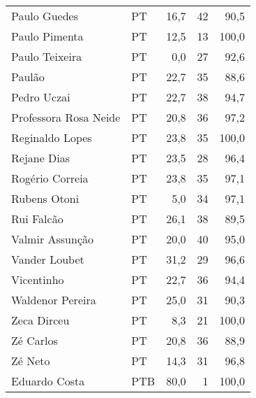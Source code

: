 \begin{longtable}{llrrr}
                        Paulo Guedes &             PT &      16,7 &           42 &       90,5 \\
                       Paulo Pimenta &             PT &      12,5 &           13 &      100,0 \\
                      Paulo Teixeira &             PT &       0,0 &           27 &       92,6 \\
                              Paulão &             PT &      22,7 &           35 &       88,6 \\
                         Pedro Uczai &             PT &      22,7 &           38 &       94,7 \\
               Professora Rosa Neide &             PT &      20,8 &           36 &       97,2 \\
                     Reginaldo Lopes &             PT &      23,8 &           35 &      100,0 \\
                         Rejane Dias &             PT &      23,5 &           28 &       96,4 \\
                     Rogério Correia &             PT &      23,8 &           35 &       97,1 \\
                        Rubens Otoni &             PT &       5,0 &           34 &       97,1 \\
                          Rui Falcão &             PT &      26,1 &           38 &       89,5 \\
                     Valmir Assunção &             PT &      20,0 &           40 &       95,0 \\
                       Vander Loubet &             PT &      31,2 &           29 &       96,6 \\
                          Vicentinho &             PT &      22,7 &           36 &       94,4 \\
                    Waldenor Pereira &             PT &      25,0 &           31 &       90,3 \\
                         Zeca Dirceu &             PT &       8,3 &           21 &      100,0 \\
                           Zé Carlos &             PT &      20,8 &           36 &       88,9 \\
                             Zé Neto &             PT &      14,3 &           31 &       96,8 \\
                       Eduardo Costa &            PTB &      80,0 &            1 &      100,0 \\

\end{longtable}
